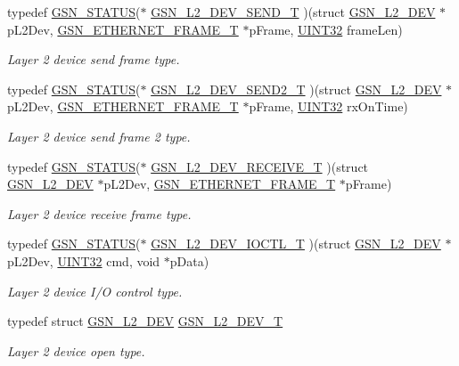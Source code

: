 \begin{DoxyCompactItemize}
typedef \hyperlink{a00660_gada5951904ac6110b1fa95e51a9ddc217}{GSN\_\-STATUS}($\ast$ \hyperlink{a00670_gab40e032c5bca66cf4f59d6c8cfa82e0a}{GSN\_\-L2\_\-DEV\_\-SEND\_\-T} )(struct \hyperlink{a00107}{GSN\_\-L2\_\-DEV} $\ast$pL2Dev, \hyperlink{a00068}{GSN\_\-ETHERNET\_\-FRAME\_\-T} $\ast$pFrame, \hyperlink{a00660_gae1e6edbbc26d6fbc71a90190d0266018}{UINT32} frameLen)
\begin{DoxyCompactList}\small\item\em Layer 2 device send frame type. \end{DoxyCompactList}\item 
typedef \hyperlink{a00660_gada5951904ac6110b1fa95e51a9ddc217}{GSN\_\-STATUS}($\ast$ \hyperlink{a00670_ga6bea88ae2a22023e68f1b064e1455411}{GSN\_\-L2\_\-DEV\_\-SEND2\_\-T} )(struct \hyperlink{a00107}{GSN\_\-L2\_\-DEV} $\ast$pL2Dev, \hyperlink{a00068}{GSN\_\-ETHERNET\_\-FRAME\_\-T} $\ast$pFrame, \hyperlink{a00660_gae1e6edbbc26d6fbc71a90190d0266018}{UINT32} rxOnTime)
\begin{DoxyCompactList}\small\item\em Layer 2 device send frame 2 type. \end{DoxyCompactList}\item 
typedef \hyperlink{a00660_gada5951904ac6110b1fa95e51a9ddc217}{GSN\_\-STATUS}($\ast$ \hyperlink{a00670_gaffd1598183dbe1898e975c2993aa4966}{GSN\_\-L2\_\-DEV\_\-RECEIVE\_\-T} )(struct \hyperlink{a00107}{GSN\_\-L2\_\-DEV} $\ast$pL2Dev, \hyperlink{a00068}{GSN\_\-ETHERNET\_\-FRAME\_\-T} $\ast$pFrame)
\begin{DoxyCompactList}\small\item\em Layer 2 device receive frame type. \end{DoxyCompactList}\item 
typedef \hyperlink{a00660_gada5951904ac6110b1fa95e51a9ddc217}{GSN\_\-STATUS}($\ast$ \hyperlink{a00670_gaeb9c0acdcf9376e138e61f00a424042a}{GSN\_\-L2\_\-DEV\_\-IOCTL\_\-T} )(struct \hyperlink{a00107}{GSN\_\-L2\_\-DEV} $\ast$pL2Dev, \hyperlink{a00660_gae1e6edbbc26d6fbc71a90190d0266018}{UINT32} cmd, void $\ast$pData)
\begin{DoxyCompactList}\small\item\em Layer 2 device I/O control type. \end{DoxyCompactList}\item 
typedef struct \hyperlink{a00107}{GSN\_\-L2\_\-DEV} \hyperlink{a00670_ga215517eb3a6f411a5378158abec2f574}{GSN\_\-L2\_\-DEV\_\-T}
\begin{DoxyCompactList}\small\item\em Layer 2 device open type. \end{DoxyCompactList}\end{DoxyCompactItemize}
